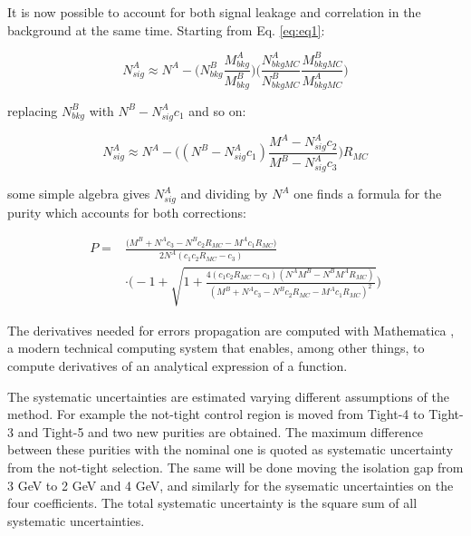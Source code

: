 \documentclass[11pt,a4paper,twoside,openright]{book}
\begin{document}
It is now possible to account for both signal leakage and correlation in the background at the same time. Starting from Eq. \ref{eq:eq1}:

\begin{equation}
    N^{A}_{sig} \approx N^{A} - \biggl( N^{B}_{bkg} \frac{M^{A}_{bkg}}{M^{B}_{bkg}} \biggr) \biggl( \frac{N^{A}_{bkgMC}}{N^{B}_{bkgMC}} \frac{M^{B}_{bkgMC}}{M^{A}_{bkgMC}} \biggr)
\end{equation}

replacing $N^{B}_{bkg}$ with $N^{B} - N^{A}_{sig}c_{1}$ and so on:

\begin{equation}
    N^{A}_{sig} \approx N^{A} - \biggl( (N^{B} - N^{A}_{sig} c_{1}) \frac{M^{A} - N^{A}_{sig} c_{2}}{M^{B} - N^{A}_{sig} c_{3}} \biggr) R_{MC}
\end{equation}

some simple algebra gives $N^{A}_{sig}$ and dividing by $N^{A}$ one finds a formula for the purity which accounts for both corrections:

\begin{equation} \label{eq:final_Na_sig}
\begin{aligned}
    P = &\frac{\bigl(M^{B} + N^{A}c_{3} - N^{B}c_{2}R_{MC} - M^{A}c_{1}R_{MC}\bigr)}{2N^{A}(c_{1}c_{2}R_{MC} - c_{3})} \\
    &\cdot \biggl(-1 + \sqrt{1 + \frac{4(c_{1}c_{2}R_{MC} - c_{3})(N^{A}M^{B} - N^{B}M^{A}R_{MC})}{(M^{B} + N^{A}c_{3} - N^{B}c_{2}R_{MC} - M^{A}c_{1}R_{MC})^{2}}}\biggr)
\end{aligned}
\end{equation} 

The derivatives needed for errors propagation are computed with Mathematica \cite{Mathematica}, a modern technical computing system that enables, among other things, to compute derivatives of an analytical expression of a function.

The systematic uncertainties are estimated varying different assumptions of the method. For example the not-tight control region is moved from Tight-4 to Tight-3 and Tight-5 and two new purities are obtained. The maximum difference between these purities with the nominal one is quoted as systematic uncertainty from the not-tight selection. The same will be done moving the isolation gap from 3 GeV to 2 GeV and 4 GeV, and similarly for the sysematic uncertainties on the four coefficients. The total systematic uncertainty is the square sum of all systematic uncertainties.
\end{document}
